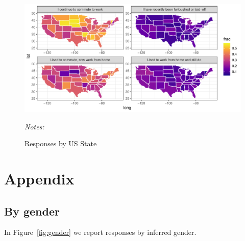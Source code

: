 \documentclass[12pt]{article}
\begin{document}
\begin{figure}
  \caption{Responses by US State} \label{fig:geo}
\centering
\begin{minipage}{1.0 \linewidth}
  \includegraphics[width = \linewidth]{plots/geo.pdf} \\
  \begin{footnotesize}
    \begin{singlespace}
      \emph{Notes:} 
    \end{singlespace}
    \end{footnotesize}
\end{minipage}
\end{figure} 



\newpage \clearpage




\appendix

\section{Appendix} 
\subsection{By gender} \label{sec:gender}

In Figure~\ref{fig:gender} we report responses by inferred gender.
\end{document}
